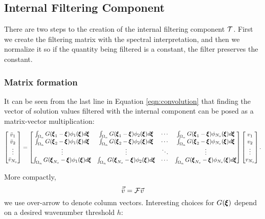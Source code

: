 \subsection{Internal Filtering Component}
There are two steps to the creation of the internal filtering component $\mathcal{T}$. First we create the filtering matrix with the spectral interpretation, and then we normalize it so if the quantity being filtered is a constant, the filter preserves the constant.
\subsubsection{Matrix formation}
It can be seen from the last line in Equation \eqref{eqn:convolution} that finding the vector of solution values filtered with the internal component can be posed as a matrix-vector multiplication:
\begin{equation*}
\label{eq:internal_matrix}
\begin{bmatrix}
\bar{v}_1 \\
\bar{v}_2 \\
\vdots\\
\bar{v}_{N_s} \\
\end{bmatrix} = 
\begin{bmatrix}
\int_{\Omega_n} G({\pmb \xi}_1 - {\pmb \xi})  \phi_1({\pmb \xi})d{\pmb \xi} &
\int_{\Omega_n} G({\pmb \xi}_1 - {\pmb \xi})  \phi_2({\pmb \xi})d{\pmb \xi} &
\cdots &
\int_{\Omega_n} G({\pmb \xi}_1 - {\pmb \xi})  \phi_{N_s}({\pmb \xi})d{\pmb \xi}\\
\int_{\Omega_n} G({\pmb \xi}_2 - {\pmb \xi})  \phi_1({\pmb \xi})d{\pmb \xi} &
\int_{\Omega_n} G({\pmb \xi}_2 - {\pmb \xi})  \phi_2({\pmb \xi})d{\pmb \xi} &
\cdots &
\int_{\Omega_n} G({\pmb \xi}_2 - {\pmb \xi})  \phi_{N_s}({\pmb \xi})d{\pmb \xi}\\
\vdots & \vdots & \ddots & \vdots\\
\int_{\Omega_n} G({\pmb \xi}_{N_s} - {\pmb \xi})  \phi_1({\pmb \xi})d{\pmb \xi} &
\int_{\Omega_n} G({\pmb \xi}_{N_s} - {\pmb \xi})  \phi_2({\pmb \xi})d{\pmb \xi} &
\cdots &
\int_{\Omega_n} G({\pmb \xi}_{N_s} - {\pmb \xi})  \phi_{N_s}({\pmb \xi})d{\pmb \xi}
\end{bmatrix}
\begin{bmatrix}
v_1 \\
v_2 \\
\vdots\\
v_{N_s} \\
\end{bmatrix}.
\end{equation*}

More compactly,
\begin{equation}
\label{eqn:filtmat}
\vec{\bar{v}} = \mathcal{F}\vec{v}
\end{equation}
we use over-arrow to denote column vectors.
Interesting choices for $G({\pmb \xi})$ depend on a desired wavenumber threshold $h$:


